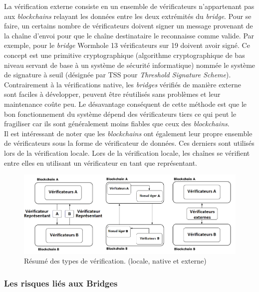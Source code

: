 La vérification externe consiste en un ensemble de vérificateurs n’appartenant pas aux \textit{\gls{blockchain}s} relayant les données entre les deux extrémités du \textit{bridge}. Pour se faire, un certains nombre de vérificateurs doivent signer un message provenant de la chaîne d’envoi pour que le chaîne destinataire le reconnaisse comme valide. Par exemple, pour le \textit{bridge} Wormhole 13 vérificateurs sur 19 doivent avoir signé\cite{NomadDocsExternal}. Ce concept est une primitive cryptographique (algorithme cryptographique de bas niveau servant de base à un système de sécurité informatique) nommée le système de signature à seuil (désignée par TSS pour \textit{Threshold Signature Scheme})\cite{BinanceTSS}. 
Contrairement à la vérifications native, les \textit{bridges} vérifiés de manière externe sont faciles à développer, peuvent être réutilisés sans problèmes et leur maintenance coûte peu. Le désavantage conséquent de cette méthode est que le bon fonctionnement du système dépend des vérificateurs tiers ce qui peut le fragiliser car ils sont généralement moins fiables que ceux des \textit{\gls{blockchain}s}. \\

Il est intéressant de noter que les \textit{\gls{blockchain}s} ont également leur propre ensemble de vérificateurs sous la forme de vérificateur de données. Ces derniers sont utilisés lors de la vérification locale. Lors de la vérification locale, les chaînes se vérifient entre elles en utilisant un vérificateur en tant que représentant.

\begin{figure}[h]
    \centering
\includegraphics[scale=0.60]{centralisation/imagesBridges/DiagrammeResumeVerif.png}
\caption{Résumé des types de vérification. (locale, native et externe)}
\label{fig:LocaleVerif}
\end{figure}

\subsubsection{Les risques liés aux Bridges}

